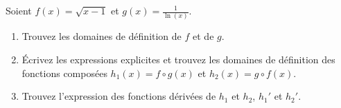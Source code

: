 
\begin{exercice}\label{exostarterST-0006}


Soient $f(x)= \sqrt{x-1}$ et $\displaystyle g(x)=\frac{1}{\ln(x)}$. 

\begin{enumerate}
\item Trouvez les domaines de définition de $f$ et de $g$.
\item Écrivez les expressions explicites et trouvez les domaines de définition des fonctions composées $h_1 (x) = f\circ g (x)$ et $h_2(x)=g\circ f (x)$.
\item Trouvez l'expression des fonctions dérivées de $h_1$ et $h_2$, $h_1'$ et $h_2'$.
\end{enumerate}
   
\end{exercice}
